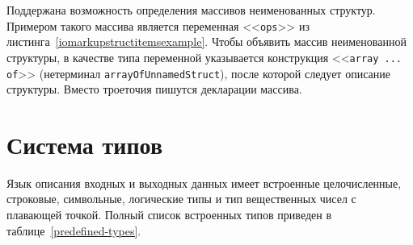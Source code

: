 \documentclass[times,specification,annotation]{style/itmo-student-thesis/itmo-student-thesis}
\begin{document}
Поддержана возможность определения массивов неименованных структур. Примером такого массива является переменная <<\texttt{ops}>> из листинга~\ref{iomarkupstructitemsexample}. Чтобы объявить массив неименованной структуры, в качестве типа переменной указывается конструкция <<\texttt{array ... of}>> (нетерминал \texttt{arrayOfUnnamedStruct}), после которой следует описание структуры. Вместо троеточия пишутся декларации массива.






\section{Система типов}\label{type-system}

Язык описания входных и выходных данных имеет встроенные целочисленные, строковые, символьные, логические типы и тип вещественных чисел с плавающей точкой. Полный список встроенных типов приведен в таблице~\ref{predefined-types}.
\end{document}
